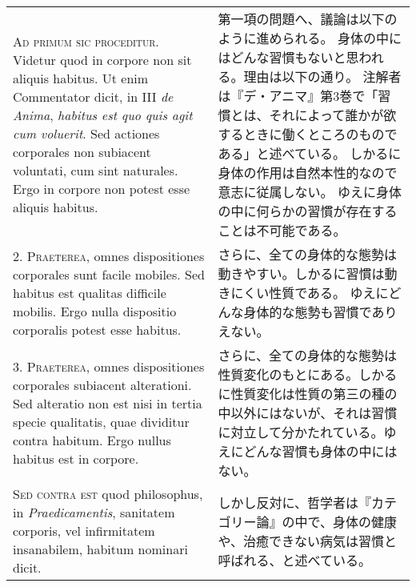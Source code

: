 \documentclass[10pt]{jsarticle} %
\begin{document}
\begin{longtable}{p{21em}p{21em}}



{\scshape Ad primum sic proceditur}. Videtur quod in corpore non sit aliquis
habitus. Ut enim Commentator dicit, in III {\itshape de Anima}, {\itshape habitus est quo
quis agit cum voluerit}. Sed actiones corporales non subiacent
voluntati, cum sint naturales. Ergo in corpore non potest esse aliquis
habitus.


&

第一項の問題へ、議論は以下のように進められる。
身体の中にはどんな習慣もないと思われる。理由は以下の通り。
注解者は『デ・アニマ』第3巻で「習慣とは、それによって誰かが欲するときに働くところのものである」と述べている。
しかるに身体の作用は自然本性的なので意志に従属しない。
ゆえに身体の中に何らかの習慣が存在することは不可能である。

\\



2. {\scshape Praeterea}, omnes dispositiones corporales sunt facile mobiles. Sed habitus est qualitas difficile mobilis. Ergo nulla dispositio corporalis potest esse habitus.

&

さらに、全ての身体的な態勢は動きやすい。しかるに習慣は動きにくい性質である。
ゆえにどんな身体的な態勢も習慣でありえない。

\\



3. {\scshape Praeterea}, omnes dispositiones corporales subiacent alterationi. Sed alteratio non est nisi in tertia specie qualitatis, quae dividitur contra habitum. Ergo nullus habitus est in corpore.

&

さらに、全ての身体的な態勢は性質変化のもとにある。しかるに性質変化は性質の第三の種の中以外にはないが、それは習慣に対立して分かたれている。ゆえにどんな習慣も身体の中にはない。

\\



{\scshape Sed contra est} quod philosophus, in {\itshape
Praedicamentis}, sanitatem corporis, vel infirmitatem insanabilem,
habitum nominari dicit.

&

しかし反対に、哲学者は『カテゴリー論』の中で、身体の健康や、治癒できない病気は習慣と呼ばれる、と述べている。


\end{longtable}
\end{document}

